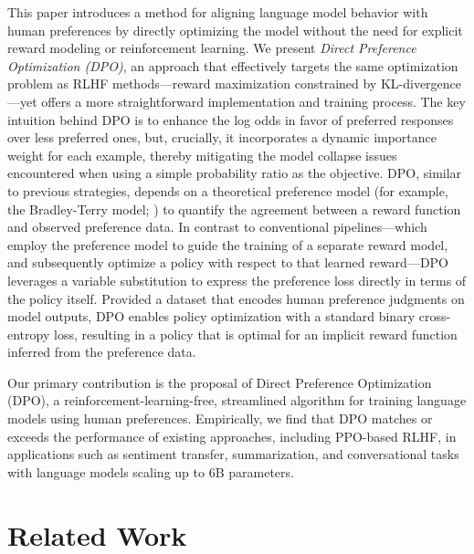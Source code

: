 This paper introduces a method for aligning language model behavior with human preferences by directly optimizing the model without the need for explicit reward modeling or reinforcement learning. We present \textit{{Direct Preference Optimization} (DPO)}, an approach that effectively targets the same optimization problem as RLHF methods—reward maximization constrained by KL-divergence—yet offers a more straightforward implementation and training process. The key intuition behind DPO is to enhance the log odds in favor of preferred responses over less preferred ones, but, crucially, it incorporates a dynamic importance weight for each example, thereby mitigating the model collapse issues encountered when using a simple probability ratio as the objective. DPO, similar to previous strategies, depends on a theoretical preference model (for example, the Bradley-Terry model; \cite{bradley1952rankanalysis}) to quantify the agreement between a reward function and observed preference data. In contrast to conventional pipelines—which employ the preference model to guide the training of a separate reward model, and subsequently optimize a policy with respect to that learned reward—DPO leverages a variable substitution to express the preference loss directly in terms of the policy itself. Provided a dataset that encodes human preference judgments on model outputs, DPO enables policy optimization with a standard binary cross-entropy loss, resulting in a policy that is optimal for an implicit reward function inferred from the preference data.

Our primary contribution is the proposal of Direct Preference Optimization (DPO), a reinforcement-learning-free, streamlined algorithm for training language models using human preferences. Empirically, we find that DPO matches or exceeds the performance of existing approaches, including PPO-based RLHF, in applications such as sentiment transfer, summarization, and conversational tasks with language models scaling up to 6B parameters.

\section{Related Work}

